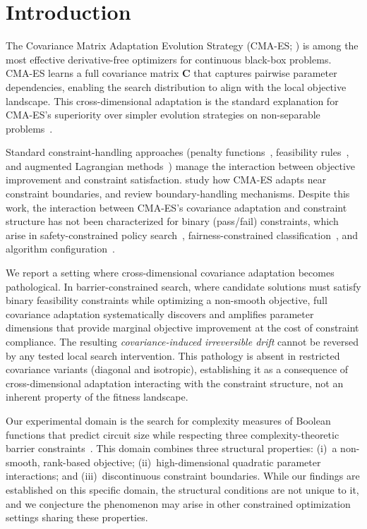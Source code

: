 \documentclass[twoside,11pt]{article}
\newcommand{\bC}{\mathbf{C}}
\begin{document}
\section{Introduction}
\label{sec:intro}

The Covariance Matrix Adaptation Evolution Strategy (CMA-ES;
\citealt{hansen2001completely,hansen2016cma}) is among the most effective
derivative-free optimizers for continuous black-box problems. CMA-ES
learns a full covariance matrix $\bC$ that captures pairwise parameter
dependencies, enabling the search distribution to align with the local
objective landscape. This cross-dimensional adaptation is the standard explanation for
CMA-ES's superiority over simpler evolution strategies on non-separable
problems~\citep{hansen2003reducing,ros2008simple}.

Standard constraint-handling approaches (penalty functions~\citep{smith1997penalty},
feasibility rules~\citep{deb2000efficient}, and augmented Lagrangian
methods~\citep{atamna2016augmented}) manage the interaction between objective
improvement and constraint satisfaction. \citet{arnold2012cmaes} study how
CMA-ES adapts near constraint boundaries, and
\citet{kramer2010cmaes} review boundary-handling mechanisms. Despite this
work, the interaction between CMA-ES's covariance adaptation and constraint
structure has not been characterized for binary (pass/fail) constraints,
which arise in safety-constrained policy search~\citep{garciarl2015safe},
fairness-constrained classification~\citep{agarwal2018fairness}, and algorithm
configuration~\citep{hutter2011smac}.

We report a setting where cross-dimensional covariance adaptation becomes
pathological. In barrier-constrained search, where candidate solutions must
satisfy binary feasibility constraints while optimizing a non-smooth
objective, full covariance adaptation systematically discovers and amplifies
parameter dimensions that provide marginal objective improvement at the cost
of constraint compliance. The resulting \emph{covariance-induced irreversible
drift} cannot be reversed by any tested local search intervention. This
pathology is absent in restricted covariance variants (diagonal and isotropic),
establishing it as a consequence of cross-dimensional adaptation interacting
with the constraint structure, not an inherent property of the fitness
landscape.

Our experimental domain is the search for complexity measures of Boolean
functions that predict circuit size while respecting three complexity-theoretic
barrier constraints~\citep{razborov1997natural,baker1975relativizations,aaronson2008algebrization}.
This domain combines three structural properties:
(i)~a non-smooth, rank-based objective;
(ii)~high-dimensional quadratic parameter interactions; and
(iii)~discontinuous constraint boundaries.
While our findings are established on this specific domain, the structural
conditions are not unique to it, and we conjecture the phenomenon may arise in
other constrained optimization settings sharing these properties.
\end{document}
